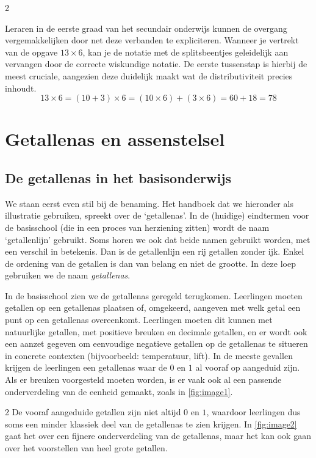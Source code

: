 \begin{multicols}{2}



Leraren in de eerste graad van het secundair onderwijs kunnen de overgang vergemakkelijken door net deze verbanden te expliciteren.
Wanneer je vertrekt van de opgave \(13 \times 6\), kan je de notatie met de splitsbeentjes geleidelijk aan vervangen door de correcte wiskundige notatie.
De eerste tussenstap is hierbij de meest cruciale, aangezien deze duidelijk maakt wat de distributiviteit precies inhoudt.
\[
13 \times 6 = (10+3)\times 6 = (10 \times 6) + (3 \times 6) = 60 + 18 = 78
\]

\section{Getallenas en assenstelsel}\label{getallen}
\subsection{De getallenas in het basisonderwijs}
We staan eerst even stil bij de benaming.
Het handboek dat we hieronder als illustratie gebruiken, spreekt over de `getallenas'.
In de (huidige) eindtermen voor de basisschool (die in een proces van herziening zitten) wordt de naam `getallenlijn' gebruikt.
Soms horen we ook dat beide namen gebruikt worden, met een verschil in betekenis.
Dan is de getallenlijn een rij getallen zonder ijk.
Enkel de ordening van de getallen is dan van belang en niet de grootte.
In deze loep gebruiken we de naam \emph{getallenas}.

In de basisschool zien we de getallenas geregeld terugkomen.
Leerlingen moeten getallen op een getallenas plaatsen of, omgekeerd, aangeven met welk getal een punt op een getallenas overeenkomt.
Leerlingen moeten dit kunnen met natuurlijke getallen, met positieve breuken en decimale getallen, en er wordt ook een aanzet gegeven om eenvoudige negatieve getallen op de getallenas te situeren in concrete contexten (bijvoorbeeld: temperatuur, lift).
In de meeste gevallen krijgen de leerlingen een getallenas waar de \(0\) en \(1\) al vooraf op aangeduid zijn.
Als er breuken voorgesteld moeten worden, is er vaak ook al een passende onderverdeling van de eenheid gemaakt, zoals in \autoref{fig:image1}.
\end{multicols}
\begin{multicols}{2}
De vooraf aangeduide getallen zijn niet altijd \(0\) en \(1\), waardoor leerlingen dus soms een minder klassiek deel van de getallenas te zien krijgen.
In \autoref{fig:image2} gaat het over een fijnere onderverdeling van de getallenas, maar het kan ook gaan over het voorstellen van heel grote getallen.
\end{multicols}

